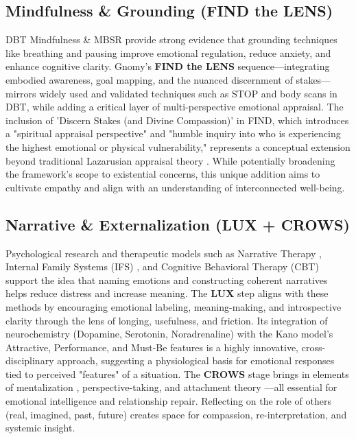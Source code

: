 \documentclass{article}
\begin{document}
\subsection{Mindfulness \& Grounding (FIND the LENS)}
DBT Mindfulness \cite{linehan1993cognitive} \& MBSR \cite{kabat1990full} provide strong evidence that grounding techniques like breathing and pausing improve emotional regulation, reduce anxiety, and enhance cognitive clarity. Gnomy's \textbf{FIND the LENS} sequence—integrating embodied awareness, goal mapping, and the nuanced discernment of stakes—mirrors widely used and validated techniques such as STOP and body scans in DBT, while adding a critical layer of multi-perspective emotional appraisal. The inclusion of 'Discern Stakes (and Divine Compassion)' in FIND, which introduces a "spiritual appraisal perspective" and "humble inquiry into who is experiencing the highest emotional or physical vulnerability," represents a conceptual extension beyond traditional Lazarusian appraisal theory \cite{lazarus1984stress}. While potentially broadening the framework's scope to existential concerns, this unique addition aims to cultivate empathy and align with an understanding of interconnected well-being.

\subsection{Narrative \& Externalization (LUX + CROWS)}
Psychological research and therapeutic models such as Narrative Therapy \cite{white1990narrative}, Internal Family Systems (IFS) \cite{schwartz1995internal}, and Cognitive Behavioral Therapy (CBT) \cite{beck1979cognitive} support the idea that naming emotions and constructing coherent narratives helps reduce distress and increase meaning. The \textbf{LUX} step aligns with these methods by encouraging emotional labeling, meaning-making, and introspective clarity through the lens of longing, usefulness, and friction. Its integration of neurochemistry (Dopamine, Serotonin, Noradrenaline) with the Kano model's Attractive, Performance, and Must-Be features \cite{kano1984attractive} is a highly innovative, cross-disciplinary approach, suggesting a physiological basis for emotional responses tied to perceived "features" of a situation. The \textbf{CROWS} stage brings in elements of mentalization \cite{fonagy2002affect}, perspective-taking, and attachment theory \cite{bowlby1969attachment}—all essential for emotional intelligence and relationship repair. Reflecting on the role of others (real, imagined, past, future) creates space for compassion, re-interpretation, and systemic insight.
\end{document}
